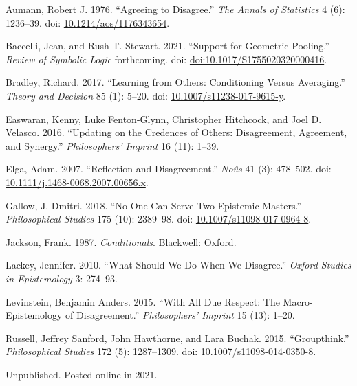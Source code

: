 \documentclass[
  10pt,
  letterpaper,
  DIV=11,
  numbers=noendperiod,
  twoside]{scrartcl}
\newlength{\cslhangindent}
\newenvironment{CSLReferences}[2] %
 {\begin{list}{}{%
  \setlength{\itemindent}{0pt}
  \setlength{\leftmargin}{0pt}
  \setlength{\parsep}{0pt}
  \ifodd #1
   \setlength{\leftmargin}{\cslhangindent}
   \setlength{\itemindent}{-1\cslhangindent}
  \fi
  \setlength{\itemsep}{#2\baselineskip}}}
 {\end{list}}
\begin{document}
\label{refs}
\begin{CSLReferences}{1}{0}
Aumann, Robert J. 1976. {``Agreeing to Disagree.''} \emph{The Annals of
Statistics} 4 (6): 1236--39. doi:
\href{https://doi.org/10.1214/aos/1176343654}{10.1214/aos/1176343654}.

Baccelli, Jean, and Rush T. Stewart. 2021. {``Support for Geometric
Pooling.''} \emph{Review of Symbolic Logic} forthcoming. doi:
\href{https://doi.org/doi:10.1017/S1755020320000416}{doi:10.1017/S1755020320000416}.

Bradley, Richard. 2017. {``Learning from Others: Conditioning Versus
Averaging.''} \emph{Theory and Decision} 85 (1): 5--20. doi:
\href{https://doi.org/10.1007/s11238-017-9615-y}{10.1007/s11238-017-9615-y}.

Easwaran, Kenny, Luke Fenton-Glynn, Christopher Hitchcock, and Joel D.
Velasco. 2016. {``Updating on the Credences of Others: Disagreement,
Agreement, and Synergy.''} \emph{Philosophers' Imprint} 16 (11): 1--39.

Elga, Adam. 2007. {``Reflection and Disagreement.''} \emph{No{û}s} 41
(3): 478--502. doi:
\href{https://doi.org/10.1111/j.1468-0068.2007.00656.x}{10.1111/j.1468-0068.2007.00656.x}.

Gallow, J. Dmitri. 2018. {``No One Can Serve Two Epistemic Masters.''}
\emph{Philosophical Studies} 175 (10): 2389--98. doi:
\href{https://doi.org/10.1007/s11098-017-0964-8}{10.1007/s11098-017-0964-8}.

Jackson, Frank. 1987. \emph{Conditionals}. Blackwell: Oxford.

Lackey, Jennifer. 2010. {``What Should We Do When We Disagree.''}
\emph{Oxford Studies in Epistemology} 3: 274--93.

Levinstein, Benjamin Anders. 2015. {``With All Due Respect: The
Macro-Epistemology of Disagreement.''} \emph{Philosophers' Imprint} 15
(13): 1--20.

Russell, Jeffrey Sanford, John Hawthorne, and Lara Buchak. 2015.
{``Groupthink.''} \emph{Philosophical Studies} 172 (5): 1287--1309. doi:
\href{https://doi.org/10.1007/s11098-014-0350-8}{10.1007/s11098-014-0350-8}.

\end{CSLReferences}



\noindent Unpublished. Posted online in 2021.
\end{document}
